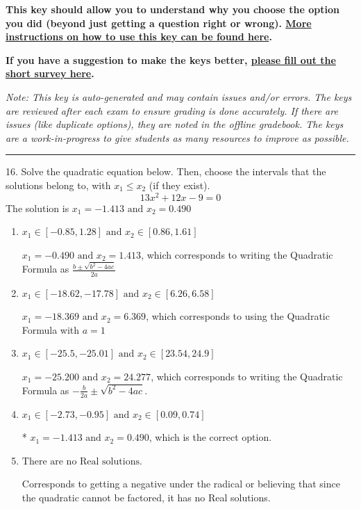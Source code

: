 \documentclass{article}[14pt]
\begin{document}
\textbf{This key should allow you to understand why you choose the option you did (beyond just getting a question right or wrong). \href{https://xronos.clas.ufl.edu/mac1105spring2020/courseDescriptionAndMisc/Exams/LearningFromResults}{More instructions on how to use this key can be found here}.}

\textbf{If you have a suggestion to make the keys better, \href{https://forms.gle/CZkbZmPbC9XALEE88}{please fill out the short survey here}.}

\textit{Note: This key is auto-generated and may contain issues and/or errors. The keys are reviewed after each exam to ensure grading is done accurately. If there are issues (like duplicate options), they are noted in the offline gradebook. The keys are a work-in-progress to give students as many resources to improve as possible.}

\rule{\textwidth}{0.4pt}

16. Solve the quadratic equation below. Then, choose the intervals that the solutions belong to, with $x_1 \leq x_2$ (if they exist).
$$ 13x^{2} +12 x -9 = 0 $$ 
The solution is $ x_1 = -1.413 \text{ and } x_2 = 0.490 $ 

\begin{enumerate}[label=\Alph*.] 
\item $ x_1 \in [-0.85, 1.28] \text{ and } x_2 \in [0.86, 1.61] $ 

  $x_1 = -0.490 \text{ and } x_2 = 1.413$, which corresponds to writing the Quadratic Formula as $\frac{b \pm \sqrt{b^2 - 4ac}}{2a}$ 
\item $ x_1 \in [-18.62, -17.78] \text{ and } x_2 \in [6.26, 6.58] $ 

  $x_1 = -18.369 \text{ and } x_2 = 6.369$, which corresponds to using the Quadratic Formula with $a=1$ 
\item $ x_1 \in [-25.5, -25.01] \text{ and } x_2 \in [23.54, 24.9] $ 

  $x_1 = -25.200 \text{ and } x_2 = 24.277$, which corresponds to writing the Quadratic Formula as $-\frac{b}{2a} \pm \sqrt{b^2 - 4ac}$. 
\item $ x_1 \in [-2.73, -0.95] \text{ and } x_2 \in [0.09, 0.74] $ 

 * $x_1 = -1.413 \text{ and } x_2 = 0.490$, which is the correct option. 
\item $ \text{There are no Real solutions.} $ 

 Corresponds to getting a negative under the radical or believing that since the quadratic cannot be factored, it has no Real solutions. 
\end{enumerate} 
 
\end{document}

